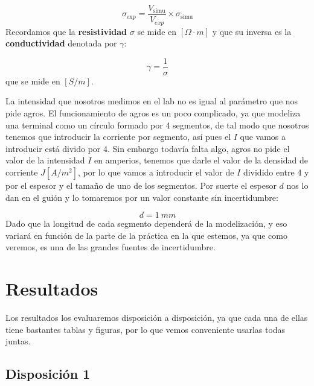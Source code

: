 \documentclass[11pt]{article}
\newcommand{\simu}{\text{simu}}
\begin{document}
\begin{equation}
	\sigma_{\exp} =  \frac{V_{\simu}}{V_{exp}} \times \sigma_{\simu}
\end{equation}
Recordamos que la \textbf{resistividad} $\sigma$ se mide en $[\Omega \cdot m]$ y que su inversa es la \textbf{conductividad} denotada por $\gamma$:

\begin{equation}
	\gamma = \frac{1}{\sigma}
\end{equation}
que se mide en $[S / m]$.

La intensidad que nosotros medimos en el lab no es igual al parámetro que nos pide agros. El funcionamiento de agros es un poco complicado, ya que modeliza una terminal como un círculo formado por 4 segmentos, de tal modo que nosotros tenemos que introducir la corriente por segmento, así pues el $I$ que vamos a introducir está divido por 4. Sin embargo todavía falta algo, agros no pide el valor de la intensidad $I$ en amperios, tenemos que darle el valor de la densidad de corriente $J [\unit{A/m^2}]$, por lo que vamos a introducir el valor de $I$ dividido entre 4 y por el espesor y el tamaño de uno de los segmentos. Por suerte el espesor $d$ nos lo dan en el guión y lo tomaremos por un valor constante sin incertidumbre:

\begin{equation}
	d = 1 \ \unit{mm}
\end{equation}
Dado que la longitud de cada segmento dependerá de la modelización, y eso variará en función de la parte de la práctica en la que estemos, ya que como veremos, es una de las grandes fuentes de incertidumbre. 



\section{Resultados}

Los resultados los evaluaremos disposición a disposición, ya que cada una de ellas tiene bastantes tablas y figuras, por lo que vemos conveniente usarlas todas juntas.  \newpage

\subsection{Disposición 1}
\end{document}
